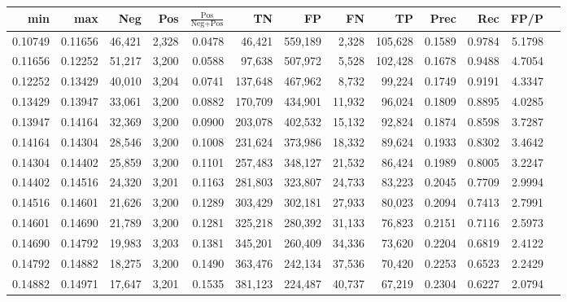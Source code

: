 \begin{tabular}{rrrrrrrrrrrrr}
\toprule
    min &     max &    Neg &   Pos & $\frac{\text{Pos}}{\text{Neg}+\text{Pos}}$ &      TN &      FP &      FN &      TP &   Prec &    Rec &   FP/P \\
\midrule
0.10749 & 0.11656 & 46,421 & 2,328 &                                     0.0478 &  46,421 & 559,189 &   2,328 & 105,628 & 0.1589 & 0.9784 & 5.1798 \\
0.11656 & 0.12252 & 51,217 & 3,200 &                                     0.0588 &  97,638 & 507,972 &   5,528 & 102,428 & 0.1678 & 0.9488 & 4.7054 \\
0.12252 & 0.13429 & 40,010 & 3,204 &                                     0.0741 & 137,648 & 467,962 &   8,732 &  99,224 & 0.1749 & 0.9191 & 4.3347 \\
0.13429 & 0.13947 & 33,061 & 3,200 &                                     0.0882 & 170,709 & 434,901 &  11,932 &  96,024 & 0.1809 & 0.8895 & 4.0285 \\
0.13947 & 0.14164 & 32,369 & 3,200 &                                     0.0900 & 203,078 & 402,532 &  15,132 &  92,824 & 0.1874 & 0.8598 & 3.7287 \\
0.14164 & 0.14304 & 28,546 & 3,200 &                                     0.1008 & 231,624 & 373,986 &  18,332 &  89,624 & 0.1933 & 0.8302 & 3.4642 \\
0.14304 & 0.14402 & 25,859 & 3,200 &                                     0.1101 & 257,483 & 348,127 &  21,532 &  86,424 & 0.1989 & 0.8005 & 3.2247 \\
0.14402 & 0.14516 & 24,320 & 3,201 &                                     0.1163 & 281,803 & 323,807 &  24,733 &  83,223 & 0.2045 & 0.7709 & 2.9994 \\
0.14516 & 0.14601 & 21,626 & 3,200 &                                     0.1289 & 303,429 & 302,181 &  27,933 &  80,023 & 0.2094 & 0.7413 & 2.7991 \\
0.14601 & 0.14690 & 21,789 & 3,200 &                                     0.1281 & 325,218 & 280,392 &  31,133 &  76,823 & 0.2151 & 0.7116 & 2.5973 \\
0.14690 & 0.14792 & 19,983 & 3,203 &                                     0.1381 & 345,201 & 260,409 &  34,336 &  73,620 & 0.2204 & 0.6819 & 2.4122 \\
0.14792 & 0.14882 & 18,275 & 3,200 &                                     0.1490 & 363,476 & 242,134 &  37,536 &  70,420 & 0.2253 & 0.6523 & 2.2429 \\
0.14882 & 0.14971 & 17,647 & 3,201 &                                     0.1535 & 381,123 & 224,487 &  40,737 &  67,219 & 0.2304 & 0.6227 & 2.0794 \\

\end{tabular}
